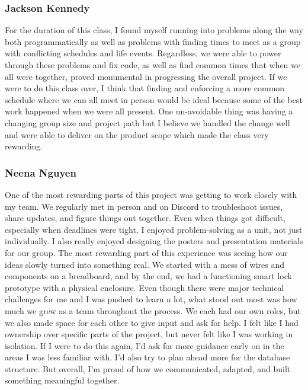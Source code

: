     \subsubsection*{Jackson Kennedy}
    For the duration of this class, I found myself running into problems along the way both programmatically as well as problems with finding times to meet as a group with conflicting schedules and life events. Regardless, we were able to power through these problems and fix code, as well as find common times that when we all were together, proved monumental in progressing the overall project. If we were to do this class over, I think that finding and enforcing a more common schedule where we can all meet in person would be ideal because some of the best work happened when we were all present. One un-avoidable thing was having a changing group size and project path but I believe we handled the change well and were able to deliver on the product scope which made the class very rewarding.

    \subsubsection*{Neena Nguyen}
    One of the most rewarding parts of this project was getting to work closely with my team. We regularly met in person and on Discord to troubleshoot issues, share updates, and figure things out together. Even when things got difficult, especially when deadlines were tight, I enjoyed problem-solving as a unit, not just individually. I also really enjoyed designing the posters and presentation materials for our group. The most rewarding part of this experience was seeing how our ideas slowly turned into something real. We started with a mess of wires and components on a breadboard, and by the end, we had a functioning smart lock prototype with a physical enclosure. Even though there were major technical challenges for me and I was pushed to learn a lot, what stood out most was how much we grew as a team throughout the process. We each had our own roles, but we also made space for each other to give input and ask for help. I felt like I had ownership over specific parts of the project, but never felt like I was working in isolation. If I were to do this again, I’d ask for more guidance early on in the areas I was less familiar with. I’d also try to plan ahead more for the database structure. But overall, I’m proud of how we communicated, adapted, and built something meaningful together.